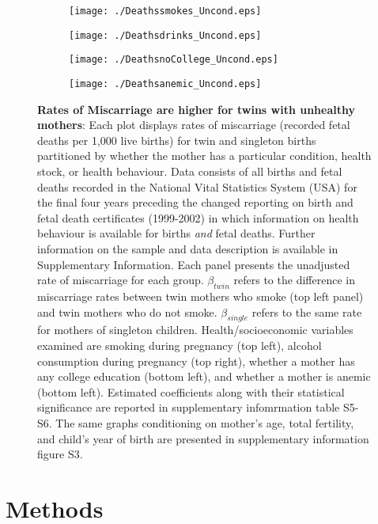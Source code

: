 \documentclass{nature}
\begin{document}
\begin{linenumbers}
\begin{spacing}{1}
\begin{figure}[htpb!]
\begin{subfigure}{.5\textwidth}
  \texttt{[image: ./Deathssmokes\_Uncond.eps]}
\end{subfigure}%
\begin{subfigure}{.5\textwidth}
  \texttt{[image: ./Deathsdrinks\_Uncond.eps]}
\end{subfigure}
\begin{subfigure}{.5\textwidth}
  \texttt{[image: ./DeathsnoCollege\_Uncond.eps]}
\end{subfigure}%
\begin{subfigure}{.5\textwidth}
  \texttt{[image: ./Deathsanemic\_Uncond.eps]}
\end{subfigure}
\vspace{5mm}
\caption{\textbf{Rates of Miscarriage are higher for twins with unhealthy mothers}: {\footnotesize Each plot displays rates of miscarriage (recorded fetal deaths per 1,000 live births) for twin and singleton births partitioned by whether the mother has a particular condition, health stock, or health behaviour.  Data consists of all births and fetal deaths recorded in the National Vital Statistics System (USA) for the final four years preceding the changed reporting on birth and fetal death certificates (1999-2002) in which information on health behaviour is available for births \emph{and} fetal deaths.  Further information on the sample and data description is available in Supplementary Information.  Each panel presents the unadjusted rate of miscarriage for each group.  $\beta_{twin}$ refers to the difference in miscarriage rates between twin mothers who smoke (top left panel) and twin mothers who do not smoke. $\beta_{single}$ refers to the same rate for mothers of singleton children.  Health/socioeconomic variables examined are smoking during pregnancy (top left), alcohol consumption during pregnancy (top right), whether a mother has any college education (bottom left), and whether a mother is anemic (bottom left).  Estimated coefficients along with their statistical significance are reported in supplementary infomrmation table S5-S6.  The same graphs conditioning on mother's age, total fertility, and child's year of birth are presented in supplementary information figure S3.}}
\label{fig:mech}
\end{figure}
\end{spacing}


\clearpage
\section{Methods}

\end{linenumbers}
\end{document}
